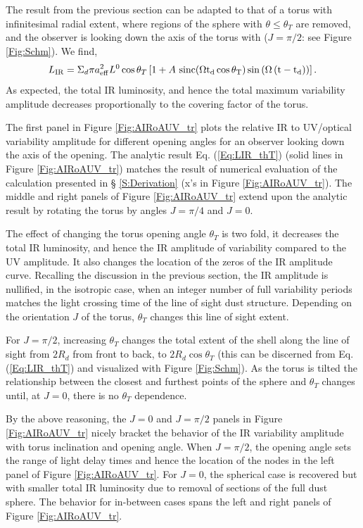 The result from the previous section can be adapted to that of a torus with
infinitesimal radial extent, where regions of the sphere with $\theta \leq
\theta_T$ are removed, and the observer is looking down the axis of the torus
with ($J=\pi/2$: see Figure \ref{Fig:Schm}). We find,
\begin{equation}
L_{\rm{IR}} =  \Sigma_d \pi  a^2_{\rm{eff}} L^0  \cos{\theta_T} \left[ 
  1 +  A  \ \rm{sinc}{\left( \Omega t_d \cos{\theta_T}\right)}  \sin{ \left( \Omega \left( t - t_d \right) \right)  }
   \right].
   \label{Eq:LIR_thT}
\end{equation}
As expected, the total IR luminosity, and hence the total maximum variability
amplitude decreases proportionally to the covering factor of the torus.

The first panel in Figure \ref{Fig:AIRoAUV_tr} plots the relative IR to
UV/optical variability amplitude for different opening angles for an observer
looking down the axis of the opening. The analytic result Eq.
(\ref{Eq:LIR_thT}) (solid lines in Figure \ref{Fig:AIRoAUV_tr}) matches
the result of numerical evaluation of the calculation presented in \S
\ref{S:Derivation} (x's in Figure \ref{Fig:AIRoAUV_tr}). The middle and
right panels of Figure \ref{Fig:AIRoAUV_tr} extend upon the analytic result by
rotating the torus by angles $J=\pi/4$ and $J=0$.

The effect of changing the torus opening angle $\theta_T$ is two fold, it
decreases the total IR luminosity, and hence the IR amplitude of variability
compared to the UV amplitude. It also changes the location of the zeros of the
IR amplitude curve. Recalling the discussion in the previous section, the IR
amplitude is nullified, in the isotropic case, when an integer number of full
variability periods matches the light crossing time of the line of sight dust
structure. Depending on the orientation $J$ of the torus, $\theta_T$ changes
this line of sight extent.

For $J=\pi/2$, increasing $\theta_T$ changes the total extent of the shell
along the line of sight from $2R_d$ from front to back, to $2
R_d\cos{\theta_T}$ (this can be discerned from Eq. (\ref{Eq:LIR_thT}) and
visualized with Figure \ref{Fig:Schm}). As the torus is tilted the
relationship between the closest and furthest points of the sphere and
$\theta_T$ changes until, at $J=0$, there is no $\theta_T$ dependence.

By the above reasoning, the $J=0$ and $J=\pi/2$ panels in Figure
\ref{Fig:AIRoAUV_tr} nicely bracket the behavior of the IR variability
amplitude with torus inclination and opening angle. When $J= \pi/2$, the
opening angle sets the range of light delay times and hence the location of
the nodes in the left panel of Figure \ref{Fig:AIRoAUV_tr}. For $J=0$, the
spherical case is recovered but with smaller total IR luminosity due to
removal of sections of the full dust sphere. The behavior for in-between cases
spans the left and right panels of Figure \ref{Fig:AIRoAUV_tr}.




